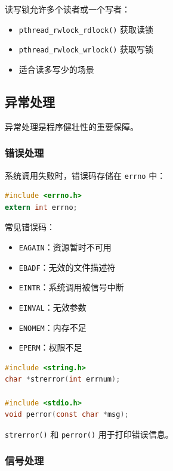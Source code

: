 读写锁允许多个读者或一个写者：
\begin{itemize}
  \item \texttt{pthread\_rwlock\_rdlock()} 获取读锁
  \item \texttt{pthread\_rwlock\_wrlock()} 获取写锁
  \item 适合读多写少的场景
\end{itemize}

\subsection{异常处理}

异常处理是程序健壮性的重要保障。

\subsubsection{错误处理}


系统调用失败时，错误码存储在 \texttt{errno} 中：
\begin{lstlisting}[language=C]
#include <errno.h>
extern int errno;
\end{lstlisting}

常见错误码：
\begin{itemize}
  \item \texttt{EAGAIN}：资源暂时不可用
  \item \texttt{EBADF}：无效的文件描述符
  \item \texttt{EINTR}：系统调用被信号中断
  \item \texttt{EINVAL}：无效参数
  \item \texttt{ENOMEM}：内存不足
  \item \texttt{EPERM}：权限不足
\end{itemize}


\begin{lstlisting}[language=C]
#include <string.h>
char *strerror(int errnum);

#include <stdio.h>
void perror(const char *msg);
\end{lstlisting}

\texttt{strerror()} 和 \texttt{perror()} 用于打印错误信息。

\subsubsection{信号处理}



